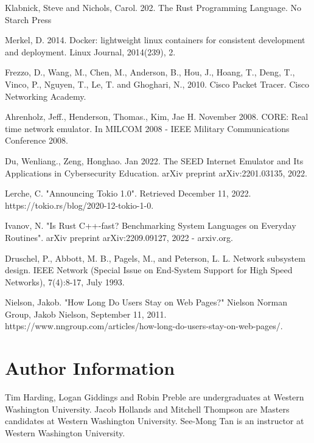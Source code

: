 \documentclass[journal]{IEEEtran} %
\begin{document}
\begin{thebibliography}{00}
     Klabnick, Steve and Nichols, Carol. 202. The Rust Programming Language. No Starch Press

     Merkel, D. 2014. Docker: lightweight linux containers for consistent development and deployment. Linux Journal, 2014(239), 2.

     Frezzo, D., Wang, M., Chen, M., Anderson, B., Hou, J., Hoang, T., Deng, T., Vinco, P., Nguyen, T., Le, T. and Ghoghari, N., 2010. Cisco Packet Tracer. Cisco Networking Academy.

     Ahrenholz, Jeff., Henderson, Thomas., Kim, Jae H. November 2008. CORE: Real time network emulator. In MILCOM 2008 - IEEE Military Communications Conference 2008.

     Du, Wenliang., Zeng, Honghao. Jan 2022. The SEED Internet Emulator and Its Applications in Cybersecurity Education. arXiv preprint arXiv:2201.03135, 2022.

     Lerche, C. "Announcing Tokio 1.0". Retrieved December 11, 2022. https://tokio.rs/blog/2020-12-tokio-1-0.

     Ivanov, N. "Is Rust C++-fast? Benchmarking System Languages on Everyday Routines". arXiv preprint arXiv:2209.09127, 2022 - arxiv.org.

     Druschel, P., Abbott, M. B., Pagels, M., and Peterson, L. L. Network subsystem design. IEEE Network (Special Issue on End-System Support for High Speed Networks), 7(4):8-17, July 1993.

     Nielson, Jakob. "How Long Do Users Stay on Web Pages?" Nielson Norman Group, Jakob Nielson, September 11, 2011. https://www.nngroup.com/articles/how-long-do-users-stay-on-web-pages/.

\end{thebibliography}



\section{Author Information}
Tim Harding, Logan Giddings and Robin Preble are undergraduates at Western Washington University. Jacob Hollands and Mitchell Thompson are Masters candidates at Western Washington University. See-Mong Tan is an instructor at Western Washington University.
\end{document}
